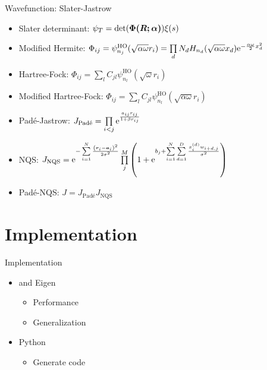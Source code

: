 \documentclass[10pt, t]{beamer}
\begin{document}
\begin{frame}[fragile]{Wavefunction: Slater-Jastrow}
    \begin{itemize}[<+->]
        \item Slater determinant: $\psi_T =
            \det(\blds{\Phi(\blds{R};\blds{\alpha})}) \xi(s)$
        \item Modified Hermite: $\Phi_{ij} =
            \psi^{\text{HO}}_{n_j}(\sqrt{\alpha\omega}r_i) = \prod\limits_d N_d
            H_{n_d}(\sqrt{\alpha \omega}x_d)\me^{-\frac{\alpha\omega}{2}x^2_d}$
        \item Hartree-Fock: $\Phi_{ij} =
            \sum\limits_lC_{jl}\psi^{\text{HO}}_{n_l}\left(\sqrt{\omega}r_i\right)$
        \item Modified Hartree-Fock: $\Phi_{ij} =
            \sum\limits_lC_{jl}\psi^{\text{HO}}_{n_l}\left(\sqrt{\alpha\omega}r_i\right)$
        \item Pad\'e-Jastrow: $J_{\text{Pad\'e}} = \prod\limits_{i<j}
            \me^{\frac{a_{ij} r_{ij}}{1 + \beta r_{ij}}}$
        \item NQS: $J_{\text{NQS}} = \me^{-\suml{i=1}{N} \frac{\left(\bm{r}_i -
            \bm{a}_i\right)^2}{2\sigma^2}}\prod\limits^{M}_j \left(1 + \me^{b_j
            + \suml{i=1}{N}\suml{d=1}{D}
            \frac{x^{(d)}_iw_{i+d,j}}{\sigma^2}}\right)$
        \item Pad\'e-NQS: $J = J_{\text{Pad\'e}}J_{\text{NQS}}$
    \end{itemize}
\end{frame}

\section{Implementation}

\begin{frame}[fragile]{Implementation}
    \begin{itemize}[<+->]
        \item \CC and Eigen
            \begin{itemize}
                \item Performance
                \item Generalization
            \end{itemize}
        \item Python
            \begin{itemize}
               \item Generate \CC code 
            \end{itemize}
    \end{itemize}
\end{frame}
\end{document}
